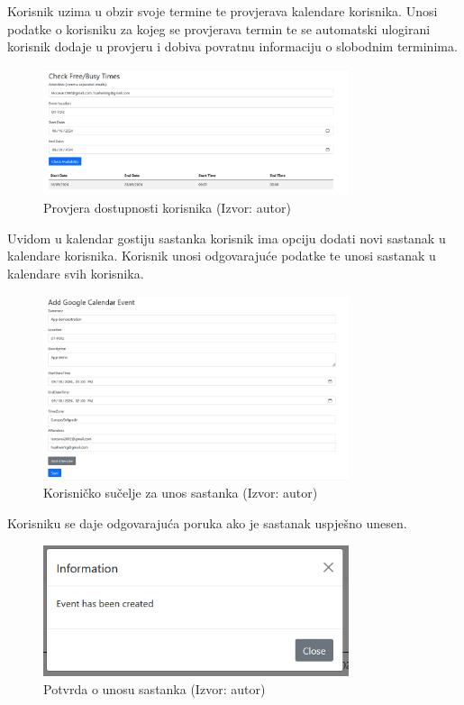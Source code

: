 \documentclass{foi}
\begin{document}
Korisnik uzima u obzir svoje termine te provjerava kalendare korisnika. Unosi podatke o korisniku za kojeg se provjerava termin te se automatski ulogirani korisnik dodaje u provjeru i dobiva povratnu informaciju o slobodnim terminima.
\begin{figure}[H]
    \centering
    \includegraphics[width=0.8\textwidth]{slike/appUsage4.png}
    \caption{Provjera dostupnosti korisnika (Izvor: autor)}
    \label{fig:createEventForAllUserss}
\end{figure}
Uvidom u kalendar gostiju sastanka korisnik ima opciju dodati novi sastanak u kalendare korisnika. Korisnik unosi odgovarajuće podatke te unosi sastanak u kalendare svih korisnika.
\begin{figure}[H]
    \centering
    \includegraphics[width=0.8\textwidth]{slike/appUsage5.png}
    \caption{Korisničko sučelje za unos sastanka (Izvor: autor)}
    \label{fig:InputMEetingUI}
\end{figure}
Korisniku se daje odgovarajuća poruka ako je sastanak uspješno unesen.
\begin{figure}[H]
    \centering
    \includegraphics[width=0.8\textwidth]{slike/appUsage6.png}
    \caption{Potvrda o unosu sastanka (Izvor: autor)}
    \label{fig:meetingconfirmPOpUp}
\end{figure}
\end{document}
